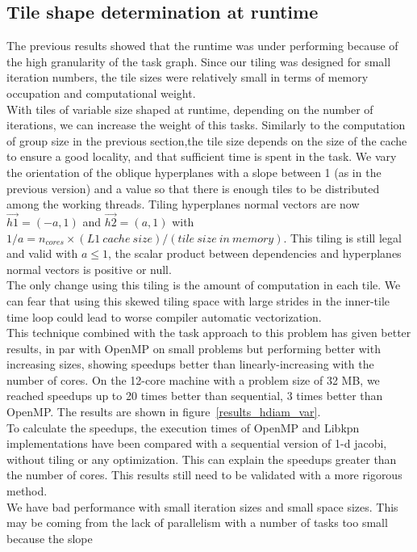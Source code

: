 \documentclass[a4paper,11pt]{article}
\begin{document}
\subsection{Tile shape determination at runtime}
The previous results showed that the runtime was under performing because of the high
granularity of the task graph. Since our tiling was designed for small iteration numbers,
the tile sizes were relatively small in terms of memory occupation and computational
weight. \\
With tiles of variable size shaped at runtime, depending on the number of iterations, we
can increase the weight of this tasks. Similarly to the computation of group size in the
previous section,the tile size depends on the size of the cache to ensure a good locality, and
that sufficient time is spent in the task. We vary the orientation of the oblique hyperplanes
with a slope between 1 (as in the previous version) and a value so that there is enough tiles
to be distributed among the working threads. Tiling hyperplanes normal vectors are now 
$\vec{h1} = (−a, 1)$ and $\vec{h2} = (a, 1)$ with $1/a = n_{cores} \times (L1 \ cache \ size) / 
(tile \ size \ in  \ memory)$.
This tiling is still legal and valid with $a \leq 1$, the scalar product between dependencies and
hyperplanes normal vectors is positive or null. \\
The only change using this tiling is the amount of computation in each tile. We can
fear that using this skewed tiling space with large strides in the inner-tile time loop 
could lead to worse compiler automatic vectorization. \\
This technique combined with the task approach to this problem has given better results, in
par with OpenMP on small problems but performing better with increasing sizes, showing
speedups better than linearly-increasing with the number of cores. On the 12-core machine
with a problem size of 32 MB, we reached speedups up to 20 times better than sequential,
3 times better than OpenMP. The results are shown in figure~\ref{results_hdiam_var}. \\
To calculate the speedups, the execution times of OpenMP and Libkpn implementations have 
been compared with a sequential  version of 1-d jacobi, without tiling or any optimization.
This can explain the speedups greater than the number of cores. This results still need to be
validated with a more rigorous method.\\
We have bad performance with small iteration sizes and small space sizes. This may be
coming from the lack of parallelism with a number of tasks too small because the slope
\end{document}
